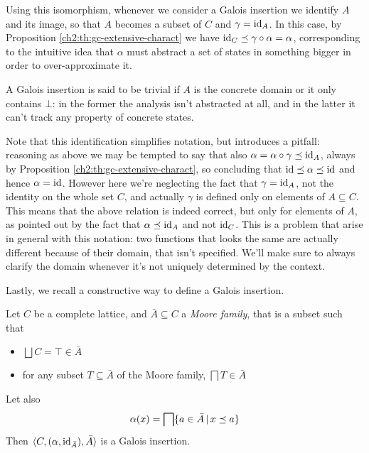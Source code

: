 Using this isomorphism, whenever we consider a Galois insertion we identify $A$ and its image, so that $A$ becomes a subset of $C$ and $\gamma = \text{id}_A$. In this case, by Proposition \ref{ch2:th:gc-extensive-charact} we have $\text{id}_C \preceq \gamma \circ \alpha = \alpha$, corresponding to the intuitive idea that $\alpha$ must abstract a set of states in something bigger in order to over-approximate it.

A Galois insertion is said to be trivial if $A$ is the concrete domain or it only contains $\bot$: in the former the analysis isn't abstracted at all, and in the latter it can't track any property of concrete states.

Note that this identification simplifies notation, but introduces a pitfall: reasoning as above we may be tempted to say that also $\alpha = \alpha \circ \gamma \preceq \text{id}_A$, always by Proposition \ref{ch2:th:gc-extensive-charact}, so concluding that $\text{id} \preceq \alpha \preceq \text{id}$ and hence $\alpha = \text{id}$. However here we're neglecting the fact that $\gamma = \text{id}_A$, not the identity on the whole set $C$, and actually $\gamma$ is defined only on elements of $A \subseteq C$. This means that the above relation is indeed correct, but only for elements of $A$, as pointed out by the fact that $\alpha \preceq \text{id}_A$ and not $\text{id}_C$. This is a problem that arise in general with this notation: two functions that looks the same are actually different because of their domain, that isn't specified. We'll make sure to always clarify the domain whenever it's not uniquely determined by the context.

Lastly, we recall a constructive way to define a Galois insertion.
\begin{prop}\label{ch2:th:gi-moore-family}
	Let $C$ be a complete lattice, and $\bar{A} \subseteq C$ a \textit{Moore family}, that is a subset such that
	\begin{itemize}
		\item $\bigsqcup C = \top \in \bar{A}$
		\item for any subset $T \subseteq \bar{A}$ of the Moore family, $\bigsqcap T \in \bar{A}$
	\end{itemize}
	Let also
	\[
	\alpha(x) = \bigsqcap \{ a \in \bar{A} \,\vert\, x \preceq a \}
	\]
	Then $\langle C, (\alpha, \text{id}_{\bar{A}}), \bar{A} \rangle$ is a Galois insertion.
\end{prop}


